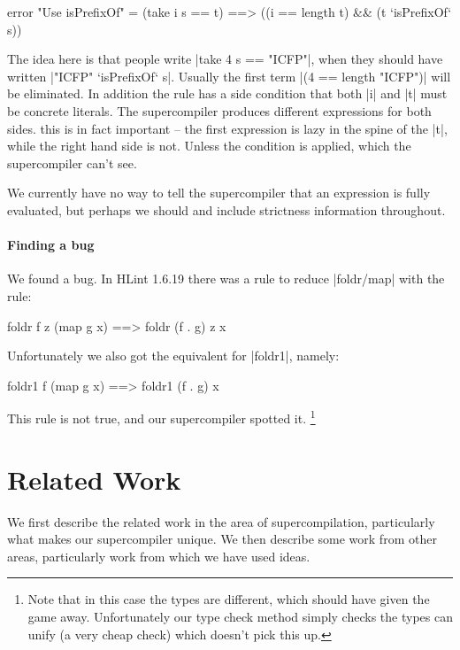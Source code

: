 \documentclass[draft]{sigplanconf}
\begin{document}
\begin{code}
error "Use isPrefixOf" = (take i s == t) ==> ((i == length t) && (t `isPrefixOf` s))
\end{code}

The idea here is that people write |take 4 s == "ICFP"|, when they should have written |"ICFP" `isPrefixOf` s|. Usually the first term |(4 == length "ICFP")| will be eliminated. In addition the rule has a side condition that both |i| and |t| must be concrete literals. The supercompiler produces different expressions for both sides. this is in fact important -- the first expression is lazy in the spine of the |t|, while the right hand side is not. Unless the condition is applied, which the supercompiler can't see.

We currently have no way to tell the supercompiler that an expression is fully evaluated, but perhaps we should and include strictness information throughout.

\paragraph{Finding a bug}

We found a bug. In HLint 1.6.19 there was a rule to reduce |foldr/map| with the rule:

\begin{code}
foldr f z (map g x) ==> foldr (f . g) z x
\end{code}

Unfortunately we also got the equivalent for |foldr1|, namely:

\begin{code}
foldr1 f (map g x) ==> foldr1 (f . g) x
\end{code}

This rule is not true, and our supercompiler spotted it. \footnote{Note that in this case the types are different, which should have given the game away. Unfortunately our type check method simply checks the types can unify (a very cheap check) which doesn't pick this up.}


\section{Related Work}

We first describe the related work in the area of supercompilation, particularly what makes our supercompiler unique. We then describe some work from other areas, particularly work from which we have used ideas.
\end{document}
